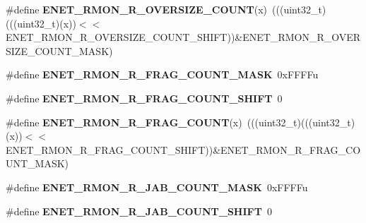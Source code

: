 \begin{DoxyCompactItemize}
\item 
\#define {\bfseries E\+N\+E\+T\+\_\+\+R\+M\+O\+N\+\_\+\+R\+\_\+\+O\+V\+E\+R\+S\+I\+Z\+E\+\_\+\+C\+O\+U\+NT}(x)~(((uint32\+\_\+t)(((uint32\+\_\+t)(x))$<$$<$E\+N\+E\+T\+\_\+\+R\+M\+O\+N\+\_\+\+R\+\_\+\+O\+V\+E\+R\+S\+I\+Z\+E\+\_\+\+C\+O\+U\+N\+T\+\_\+\+S\+H\+I\+FT))\&E\+N\+E\+T\+\_\+\+R\+M\+O\+N\+\_\+\+R\+\_\+\+O\+V\+E\+R\+S\+I\+Z\+E\+\_\+\+C\+O\+U\+N\+T\+\_\+\+M\+A\+SK)\hypertarget{group__ENET__Register__Masks_gac5c81ea4fdcc881701c632c99e58a341}{}\label{group__ENET__Register__Masks_gac5c81ea4fdcc881701c632c99e58a341}

\item 
\#define {\bfseries E\+N\+E\+T\+\_\+\+R\+M\+O\+N\+\_\+\+R\+\_\+\+F\+R\+A\+G\+\_\+\+C\+O\+U\+N\+T\+\_\+\+M\+A\+SK}~0x\+F\+F\+F\+Fu\hypertarget{group__ENET__Register__Masks_ga5f5c83f39cebf731ec8d463d94ce3f03}{}\label{group__ENET__Register__Masks_ga5f5c83f39cebf731ec8d463d94ce3f03}

\item 
\#define {\bfseries E\+N\+E\+T\+\_\+\+R\+M\+O\+N\+\_\+\+R\+\_\+\+F\+R\+A\+G\+\_\+\+C\+O\+U\+N\+T\+\_\+\+S\+H\+I\+FT}~0\hypertarget{group__ENET__Register__Masks_ga5ef532dea7d45ccc23afff7d7c17c16f}{}\label{group__ENET__Register__Masks_ga5ef532dea7d45ccc23afff7d7c17c16f}

\item 
\#define {\bfseries E\+N\+E\+T\+\_\+\+R\+M\+O\+N\+\_\+\+R\+\_\+\+F\+R\+A\+G\+\_\+\+C\+O\+U\+NT}(x)~(((uint32\+\_\+t)(((uint32\+\_\+t)(x))$<$$<$E\+N\+E\+T\+\_\+\+R\+M\+O\+N\+\_\+\+R\+\_\+\+F\+R\+A\+G\+\_\+\+C\+O\+U\+N\+T\+\_\+\+S\+H\+I\+FT))\&E\+N\+E\+T\+\_\+\+R\+M\+O\+N\+\_\+\+R\+\_\+\+F\+R\+A\+G\+\_\+\+C\+O\+U\+N\+T\+\_\+\+M\+A\+SK)\hypertarget{group__ENET__Register__Masks_ga83e66016eed8916198ebd6604af4e1aa}{}\label{group__ENET__Register__Masks_ga83e66016eed8916198ebd6604af4e1aa}

\item 
\#define {\bfseries E\+N\+E\+T\+\_\+\+R\+M\+O\+N\+\_\+\+R\+\_\+\+J\+A\+B\+\_\+\+C\+O\+U\+N\+T\+\_\+\+M\+A\+SK}~0x\+F\+F\+F\+Fu\hypertarget{group__ENET__Register__Masks_ga838c0d34688a6347e786a3a66de2fc66}{}\label{group__ENET__Register__Masks_ga838c0d34688a6347e786a3a66de2fc66}

\item 
\#define {\bfseries E\+N\+E\+T\+\_\+\+R\+M\+O\+N\+\_\+\+R\+\_\+\+J\+A\+B\+\_\+\+C\+O\+U\+N\+T\+\_\+\+S\+H\+I\+FT}~0\hypertarget{group__ENET__Register__Masks_gaec7a433149507aefe611734ae19e7878}{}\label{group__ENET__Register__Masks_gaec7a433149507aefe611734ae19e7878}


\end{DoxyCompactItemize}
